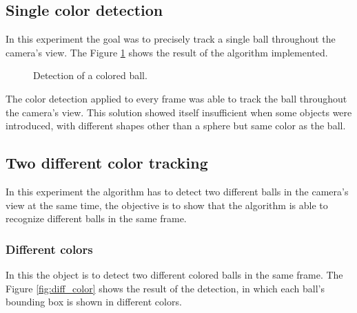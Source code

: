 \documentclass[10pt,twocolumn,letterpaper]{article}
\begin{document}
\subsection{Single color detection}

In this experiment the goal was to precisely track a single ball throughout the camera's view. The Figure \ref{fig:single_color} shows the result of the algorithm implemented.

\begin{figure}[!h]
\centering
\setlength{\fboxsep}{1pt}
\setlength{\fboxrule}{1pt}
\caption{Detection of a colored ball.}\label{fig:single_color}
\end{figure}

The color detection applied to every frame was able to track the ball throughout the camera's view. This solution showed itself insufficient when some objects were introduced, with different shapes other than a sphere but same color as the ball.

\subsection{Two different color tracking}

In this experiment the algorithm has to detect two different balls in the camera's view at the same time, the objective is to show that the algorithm is able to recognize different balls in the same frame.

\subsubsection{Different colors}

In this the object is to detect two different colored balls in the same frame. The Figure \ref{fig:diff_color} shows the result of the detection, in which each ball's  bounding box is shown in different colors.
\end{document}

